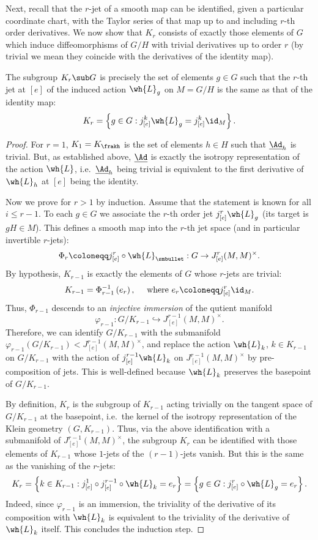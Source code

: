 Next, recall that the $r$-jet of a smooth map can be identified, given a particular coordinate chart, with the Taylor series of that map up to and including $r$-th order derivatives. We now show that $K_r$ consists of exactly those elements of $G$ which induce diffeomorphisms of $G\slash H$ with trivial derivatives up to order $r$ (by trivial we mean they coincide with the derivatives of the identity map).

\begin{lem}
    The subgroup $K_r\sub G$ is precisely the set of elements $g\in G$
    such that the $r$-th jet at $[e]$ of the induced action $\wh{L}_g$ on $M=G\slash H$ is the same as that of the identity map:
    \[K_r=\left\{g\in G: j^k_{[e]}\wh{L}_g=j^k_{[e]}\id_{M}\right\}.\]
\end{lem}
\begin{proof}
    For $r=1$, $K_1=K_{\frakh}$ is the set of elements $h\in H$ such that $\underline{\Ad}_h$ is trivial. But, as established above, $\underline{\Ad}$ is exactly the isotropy representation of the action $\wh{L}$, i.e.\ $\underline{\Ad}_h$ being trivial is equivalent to the first derivative of $\wh{L}_h$ at $[e]$ being the identity.

    Now we prove for $r>1$ by induction. Assume that the statement is known for all $i\leq r-1$. To each $g\in G$ we associate the $r$-th order jet $j^r_{[e]}\wh{L}_g$ (its target is $gH\in M$). This defines a smooth map into the $r$-th jet space (and in particular invertible $r$-jets):
    \[\Phi_r\coloneqq j_{[e]}^r\circ \wh{L}_{\smbullet}: G\to J^r_{[e]}(M,M)^\times.\]
    By hypothesis, $K_{r-1}$ is exactly the elements of $G$ whose $r$-jets are trivial:
    \[K_{r-1}=\Phi_{r-1}^{-1}\left(e_r\right), \quad \text{ where }e_r\coloneqq j^r_{[e]}\id_M.\]
    Thus, $\Phi_{r-1}$ descends to an \emph{injective immersion} of the qutient manifold
    \[\varphi_{r-1}:G\slash K_{r-1}\hookrightarrow J^{r-1}_{[e]}(M,M)^\times.\]
    Therefore, we can identify $G\slash K_{r-1}$ with the submanifold $\varphi_{r-1}(G\slash K_{r-1})< J^{r-1}_{[e]}(M,M)^\times$, and replace the action $\wh{L}_k$, $k\in K_{r-1}$ on $G\slash K_{r-1}$ with the action of $j^{r-1}_{[e]}\wh{L}_k$ on $J^{r-1}_{[e]}(M,M)^\times$ by pre-composition of jets. This is well-defined because $\wh{L}_k$ preserves the basepoint of $G\slash K_{r-1}$.
    
    By definition, $K_r$ is the subgroup of $K_{r-1}$ acting trivially on the tangent space of $G\slash K_{r-1}$ at the basepoint, i.e.\ the kernel of the isotropy representation of the Klein geometry $(G,K_{r-1})$. Thus, via the above identification with a submanifold of $J^{r-1}_{[e]}(M,M)^\times$, the subgroup $K_r$ can be identified with those elements of $K_{r-1}$ whose $1$-jets of the $(r-1)$-jets vanish. But this is the same as the vanishing of the $r$-jets: 
    \[K_r=\left\{k\in K_{r-1}: j^1_{[e]}\circ j^{r-1}_{[e]}\circ\wh{L}_k=e_r\right\}=\left\{g\in G: j^r_{[e]}\circ \wh{L}_g=e_r\right\}.\]
    Indeed, since $\varphi_{r-1}$ is an immersion, the triviality of the derivative of its composition with $\wh{L}_k$ is equivalent to the triviality of the derivative of $\wh{L}_k$ itself. This concludes the induction step.
\end{proof}



